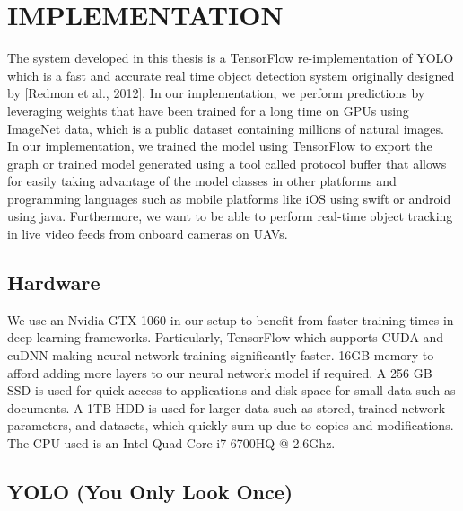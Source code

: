 %
%
%

\chapter{\uppercase{Implementation}}

The system developed in this thesis  is a TensorFlow re-implementation of  YOLO which is a fast and accurate real time object detection system originally designed by [Redmon et al., 2012]. In our implementation, we perform predictions by leveraging weights that have been trained for a long time on GPUs using ImageNet data, which is a public dataset containing millions of natural images. In our implementation, we trained the model using TensorFlow to export the graph or trained model generated using a tool called protocol buffer that  allows for easily taking advantage of the model classes in other platforms and programming languages such as mobile platforms like iOS using swift or android using java. Furthermore, we want to be able to perform real-time object tracking in live video feeds from onboard cameras on UAVs.

\section{Hardware}
We use an Nvidia GTX 1060 in our setup to benefit from faster training times in deep learning frameworks. Particularly,  TensorFlow which supports CUDA and cuDNN making neural network training significantly faster. 16GB memory to afford adding more layers to our neural network model if  required. A 256 GB SSD is used for quick access to applications and disk space for small data such as documents. A 1TB HDD is used for larger data such as stored, trained network parameters, and datasets, which quickly sum up due to copies and modifications. The CPU used is an Intel Quad-Core i7 6700HQ @ 2.6Ghz.

\pagebreak
\section{YOLO (You Only Look Once)}

